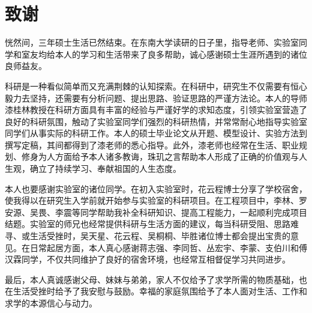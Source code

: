 \chapter{致谢}
恍然间，三年硕士生活已然结束。在东南大学读研的日子里，指导老师、实验室同学和室友均给本人的学习和生活带来了良多帮助，诚心感谢硕士生涯所遇到的诸位良师益友。

科研是一种看似简单而又充满荆棘的认知探索。在科研中，研究生不仅需要有恒心毅力去坚持，还需要有分析问题、提出思路、验证思路的严谨方法论。本人的导师漆桂林教授在科研方面具有丰富的经验与严谨好学的求知态度，引领实验室营造了良好的科研氛围，触动了实验室同学们强烈的科研热情，并常常耐心地指导实验室同学们从事实际的科研工作。本人的硕士毕业论文从开题、模型设计、实验方法到撰写定稿，其间都得到了漆老师的悉心指导。此外，漆老师也经常在生活、职业规划、修身为人方面给予本人诸多教诲，珠玑之言帮助本人形成了正确的价值观与人生观，确立了持续学习、奉献祖国的人生态度。

本人也要感谢实验室的诸位同学。在初入实验室时，花云程博士分享了学校宿舍，使我得以在研究生入学前就开始参与实验室的科研项目。在工程项目中，李林、罗安源、吴畏、李震等同学帮助我补全科研知识、提高工程能力，一起顺利完成项目结题。实验室的师兄也经常提供科研与生活方面的建议，每当科研受阻、思路难寻、或生活受挫时，吴天星、花云程、吴桐桐、毕胜诸位博士都会提出宝贵的意见。在日常起居方面，本人真心感谢蒋志强、李同哲、丛宏宇、李蒙、支伯川和傅汉霖同学，不仅共同维护了良好的宿舍环境，也经常互相督促学习共同进步。

最后，本人真诚感谢父母、妹妹与弟弟，家人不仅给予了求学所需的物质基础，也在生活受挫时给予了我安慰与鼓励。幸福的家庭氛围给予了本人面对生活、工作和求学的本源信心与动力。


























